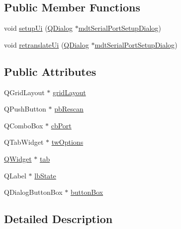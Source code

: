 \subsection*{Public Member Functions}
\begin{DoxyCompactItemize}
\item 
void \hyperlink{class_ui__mdt_serial_port_setup_dialog_a87469f82d3434e0f1dfc4d2fc8b5fe70}{setup\-Ui} (\hyperlink{class_q_dialog}{Q\-Dialog} $\ast$\hyperlink{classmdt_serial_port_setup_dialog}{mdt\-Serial\-Port\-Setup\-Dialog})
\item 
void \hyperlink{class_ui__mdt_serial_port_setup_dialog_a7c928e55ed37a6a05d178fa6e45c0ef2}{retranslate\-Ui} (\hyperlink{class_q_dialog}{Q\-Dialog} $\ast$\hyperlink{classmdt_serial_port_setup_dialog}{mdt\-Serial\-Port\-Setup\-Dialog})
\end{DoxyCompactItemize}
\subsection*{Public Attributes}
\begin{DoxyCompactItemize}
\item 
Q\-Grid\-Layout $\ast$ \hyperlink{class_ui__mdt_serial_port_setup_dialog_a13a11e9f9ccf2a2b55dcb9b90fb4db94}{grid\-Layout}
\item 
Q\-Push\-Button $\ast$ \hyperlink{class_ui__mdt_serial_port_setup_dialog_a00ab731bc8c63f64ef981783f3434c17}{pb\-Rescan}
\item 
Q\-Combo\-Box $\ast$ \hyperlink{class_ui__mdt_serial_port_setup_dialog_afbf0c0bf5fe40ba41986a4548dd32ad1}{cb\-Port}
\item 
Q\-Tab\-Widget $\ast$ \hyperlink{class_ui__mdt_serial_port_setup_dialog_a679def9ad26fd3b5d14ce47c0445dae9}{tw\-Options}
\item 
\hyperlink{class_q_widget}{Q\-Widget} $\ast$ \hyperlink{class_ui__mdt_serial_port_setup_dialog_a2fba2d05e85b4d015d317703637d387f}{tab}
\item 
Q\-Label $\ast$ \hyperlink{class_ui__mdt_serial_port_setup_dialog_a8b460fe6e70b33cc1d5a988732bc918c}{lb\-State}
\item 
Q\-Dialog\-Button\-Box $\ast$ \hyperlink{class_ui__mdt_serial_port_setup_dialog_ad838e2dd8bbfeb9c9dc084d1f7d3e023}{button\-Box}
\end{DoxyCompactItemize}


\subsection{Detailed Description}


